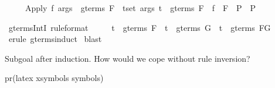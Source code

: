 \begin{isabellebody}
\begin{isamarkuptext}
\begin{isabelle}%
\ \ \ \ \ Apply\ f\ args\ {\isasymin}\ gterms\ F\ {\isasymLongrightarrow}\ {\isacharparenleft}{\isasymforall}t{\isasymin}set\ args{\isachardot}\ t\ {\isasymin}\ gterms\ F\ {\isasymLongrightarrow}\ f\ {\isasymin}\ F\ {\isasymLongrightarrow}\ P{\isacharparenright}\ {\isasymLongrightarrow}\ P%
\end{isabelle}
%
\end{isamarkuptext}%
\ gterms{\isacharunderscore}IntI\ {\isacharbrackleft}rule{\isacharunderscore}format{\isacharbrackright}{\isacharcolon}\isanewline
\ \ \ \ \ {\isachardoublequote}t\ {\isasymin}\ gterms\ F\ {\isasymLongrightarrow}\ t\ {\isasymin}\ gterms\ G\ {\isasymlongrightarrow}\ t\ {\isasymin}\ gterms\ {\isacharparenleft}F{\isasyminter}G{\isacharparenright}{\isachardoublequote}\isanewline
{}\ {\isacharparenleft}erule\ gterms{\isachardot}induct{\isacharparenright}\isanewline
{}\ blast\isanewline
{}%
\begin{isamarkuptext}%
Subgoal after induction.  How would we cope without rule inversion?

pr(latex xsymbols symbols)


\end{isamarkuptext}
\end{isabellebody}
